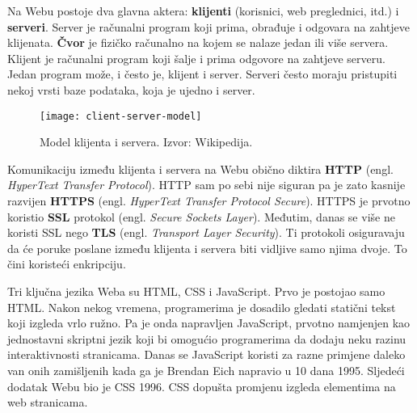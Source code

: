 Na Webu postoje dva glavna aktera: \textbf{klijenti} (korisnici, web preglednici, itd.) i \textbf{serveri}.
Server je računalni program koji prima, obrađuje i odgovara na zahtjeve klijenata.
\textbf{Čvor} je fizičko računalno na kojem se nalaze jedan ili više servera.
Klijent je računalni program koji šalje i prima odgovore na zahtjeve serveru.
Jedan program može, i često je, klijent i server.
Serveri često moraju pristupiti nekoj vrsti baze podataka, koja je ujedno i server.

\begin{figure}[h]
    \texttt{[image: client-server-model]}
    \caption{Model klijenta i servera. Izvor: Wikipedija.}\label{fig:figure7}
\end{figure}

Komunikaciju između klijenta i servera na Webu obično diktira \textbf{HTTP} (engl. \textit{HyperText Transfer Protocol}).
HTTP sam po sebi nije siguran pa je zato kasnije razvijen \textbf{HTTPS} (engl. \textit{HyperText Transfer Protocol Secure}).
HTTPS je prvotno koristio \textbf{SSL} protokol (engl. \textit{Secure Sockets Layer}).
Međutim, danas se više ne koristi SSL nego \textbf{TLS} (engl. \textit{Transport Layer Security}).
Ti protokoli osiguravaju da će poruke poslane između klijenta i servera biti vidljive samo njima dvoje.
To čini koristeći enkripciju.

Tri ključna jezika Weba su HTML, CSS i JavaScript.
Prvo je postojao samo HTML.\@
Nakon nekog vremena, programerima je dosadilo gledati statični tekst koji izgleda vrlo ružno.
Pa je onda napravljen JavaScript, prvotno namjenjen kao jednostavni skriptni jezik koji bi omogućio programerima da dodaju neku razinu interaktivnosti stranicama.
Danas se JavaScript koristi za razne primjene daleko van onih zamišljenih kada ga je Brendan Eich napravio u 10 dana 1995.
Sljedeći dodatak Webu bio je CSS 1996.
CSS dopušta promjenu izgleda elementima na web stranicama.

